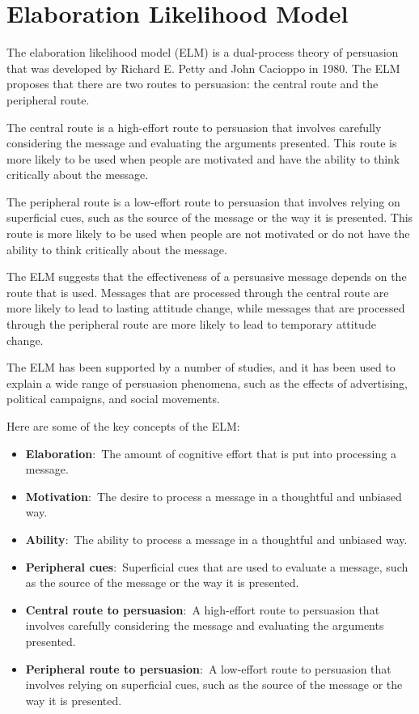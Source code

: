 \documentclass[
  b5paper]{book}
\begin{document}
\hypertarget{elaboration-likelihood-model}{%
\section{Elaboration Likelihood Model}\label{elaboration-likelihood-model}}

The elaboration likelihood model (ELM) is a dual-process theory of persuasion that was developed by Richard E. Petty and John Cacioppo in 1980. The ELM proposes that there are two routes to persuasion: the central route and the peripheral route.

The central route is a high-effort route to persuasion that involves carefully considering the message and evaluating the arguments presented. This route is more likely to be used when people are motivated and have the ability to think critically about the message.

The peripheral route is a low-effort route to persuasion that involves relying on superficial cues, such as the source of the message or the way it is presented. This route is more likely to be used when people are not motivated or do not have the ability to think critically about the message.

The ELM suggests that the effectiveness of a persuasive message depends on the route that is used. Messages that are processed through the central route are more likely to lead to lasting attitude change, while messages that are processed through the peripheral route are more likely to lead to temporary attitude change.

The ELM has been supported by a number of studies, and it has been used to explain a wide range of persuasion phenomena, such as the effects of advertising, political campaigns, and social movements.

Here are some of the key concepts of the ELM:

\begin{itemize}
\item
  \textbf{Elaboration}:~The amount of cognitive effort that is put into processing a message.
\item
  \textbf{Motivation}:~The desire to process a message in a thoughtful and unbiased way.
\item
  \textbf{Ability}:~The ability to process a message in a thoughtful and unbiased way.
\item
  \textbf{Peripheral cues}:~Superficial cues that are used to evaluate a message, such as the source of the message or the way it is presented.
\item
  \textbf{Central route to persuasion}:~A high-effort route to persuasion that involves carefully considering the message and evaluating the arguments presented.
\item
  \textbf{Peripheral route to persuasion}:~A low-effort route to persuasion that involves relying on superficial cues, such as the source of the message or the way it is presented.
\end{itemize}
\end{document}
